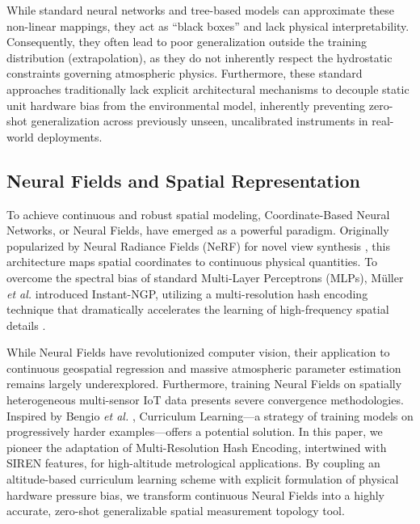 While standard neural networks and tree-based models can approximate these non-linear mappings, they act as ``black boxes'' and lack physical interpretability. Consequently, they often lead to poor generalization outside the training distribution (extrapolation), as they do not inherently respect the hydrostatic constraints governing atmospheric physics. Furthermore, these standard approaches traditionally lack explicit architectural mechanisms to decouple static unit hardware bias from the environmental model, inherently preventing zero-shot generalization across previously unseen, uncalibrated instruments in real-world deployments.

\subsection{Neural Fields and Spatial Representation}
To achieve continuous and robust spatial modeling, Coordinate-Based Neural Networks, or Neural Fields, have emerged as a powerful paradigm. Originally popularized by Neural Radiance Fields (NeRF) for novel view synthesis \cite{mildenhall2020nerf}, this architecture maps spatial coordinates to continuous physical quantities. To overcome the spectral bias of standard Multi-Layer Perceptrons (MLPs), M\"{u}ller \textit{et al.} introduced Instant-NGP, utilizing a multi-resolution hash encoding technique that dramatically accelerates the learning of high-frequency spatial details \cite{muller2022instant}.

While Neural Fields have revolutionized computer vision, their application to continuous geospatial regression and massive atmospheric parameter estimation remains largely underexplored. Furthermore, training Neural Fields on spatially heterogeneous multi-sensor IoT data presents severe convergence methodologies. Inspired by Bengio \textit{et al.} \cite{bengio2009curriculum}, Curriculum Learning—a strategy of training models on progressively harder examples—offers a potential solution. In this paper, we pioneer the adaptation of Multi-Resolution Hash Encoding, intertwined with SIREN features, for high-altitude metrological applications. By coupling an altitude-based curriculum learning scheme with explicit formulation of physical hardware pressure bias, we transform continuous Neural Fields into a highly accurate, zero-shot generalizable spatial measurement topology tool.
